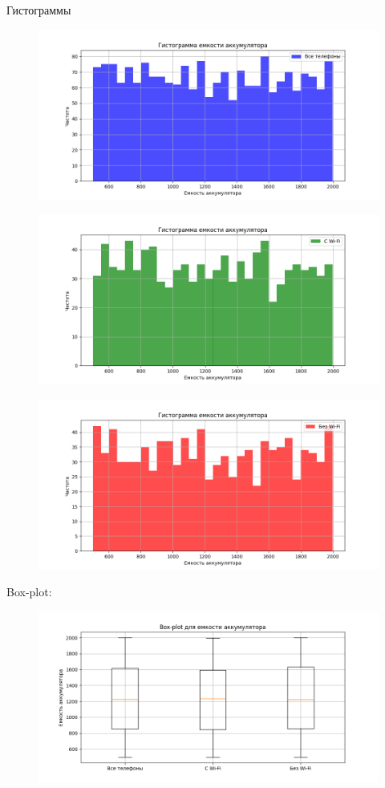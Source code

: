 \documentclass{article}
\begin{document}
Гистограммы
\begin{figure}[H]
      \centering
      \includegraphics[width=0.5\linewidth]{Python/hist-all-phones.png}
\end{figure}
\begin{figure}[H]
      \centering
      \includegraphics[width=0.5\linewidth]{Python/hist-wi-fi.png}
\end{figure}
\begin{figure}[H]
      \centering
      \includegraphics[width=0.5\linewidth]{Python/hist-without-wi-fi.png}
\end{figure}

Box-plot:
\begin{figure}[H]
      \centering
      \includegraphics[width=0.5\linewidth]{Python/box-plot.png}
\end{figure}
\end{document}
